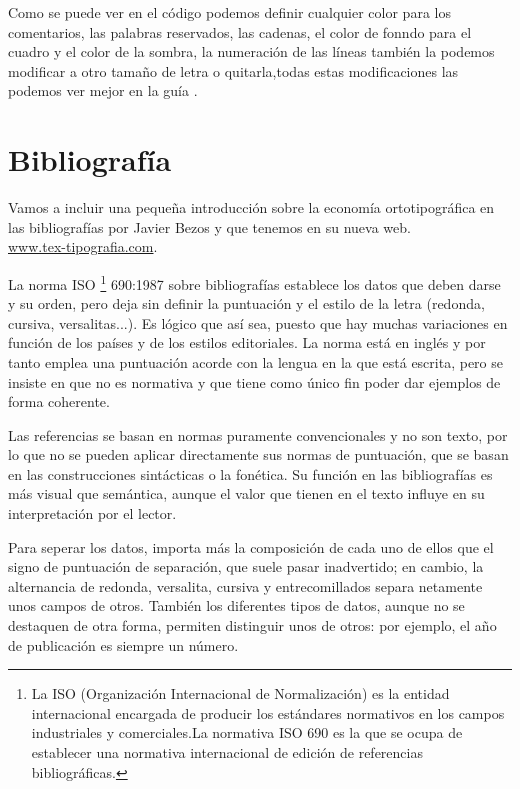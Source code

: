 Como se puede ver en el código podemos definir cualquier color para los comentarios, las palabras reservados, las cadenas,  el color de fonndo para el cuadro y el color de la sombra, la numeración de las líneas también la podemos modificar a otro tamaño de letra o quitarla,todas estas modificaciones las podemos ver mejor en la guía \cite{guialistings}.
\pagebreak


\section{Bibliografía}\label{sec:custombib}
Vamos a incluir una pequeña introducción sobre la economía ortotipográfica en las bibliografías por Javier Bezos y que tenemos en su   nueva web.\\
\url{www.tex-tipografia.com}.

La norma ISO \footnote{La ISO (Organización Internacional de Normalización) es la entidad internacional encargada de producir los estándares normativos en los campos industriales y comerciales.La normativa ISO 690 es la que se ocupa de establecer una normativa internacional de edición de referencias bibliográficas.} 690:1987 sobre bibliografías establece los datos que deben darse y su orden, pero deja sin definir la puntuación y el estilo de la letra (redonda, cursiva, versalitas...). Es lógico que así sea, puesto que hay muchas variaciones en función de los países y de los estilos editoriales. La norma está en inglés y por tanto emplea una puntuación acorde con la lengua en la que está escrita, pero se insiste en que no es normativa y que tiene como único fin poder dar ejemplos de forma coherente.

Las referencias se basan en normas puramente convencionales y no son texto, por lo que no se pueden aplicar directamente sus normas de puntuación, que se basan en las construcciones sintácticas o la fonética. Su función en las bibliografías es más visual que semántica, aunque el valor que tienen en el texto influye en su interpretación por el lector.

Para seperar los datos, importa más la composición de cada uno de ellos que el signo de puntuación de separación, que suele pasar inadvertido; en cambio, la alternancia de redonda, versalita, cursiva y entrecomillados separa netamente unos campos de otros. También los diferentes tipos de datos, aunque no se destaquen de otra forma, permiten distinguir unos de otros: por ejemplo, el año de publicación es siempre un número.

